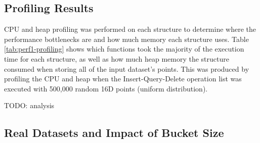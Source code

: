 \subsection{Profiling Results}

CPU and heap profiling was performed on each structure to determine where the performance bottlenecks are and how much memory each structure uses. Table \ref{tab:perf1-profiling} shows which functions took the majority of the execution time for each structure, as well as how much heap memory the structure consumed when storing all of the input dataset's points. This was produced by profiling the CPU and heap when the Insert-Query-Delete operation list was executed with 500,000 random 16D points (uniform distribution).

\begin{table}
	\centering
	\caption{CPU and Heap Profiling Statistics for Insert-Query Delete Operation List with 500,000 Points from 16D Uniform Synthetic Dataset}
	\label{tab:perf1-profiling}
\end{table}

TODO: analysis

\subsection{Real Datasets and Impact of Bucket Size}

